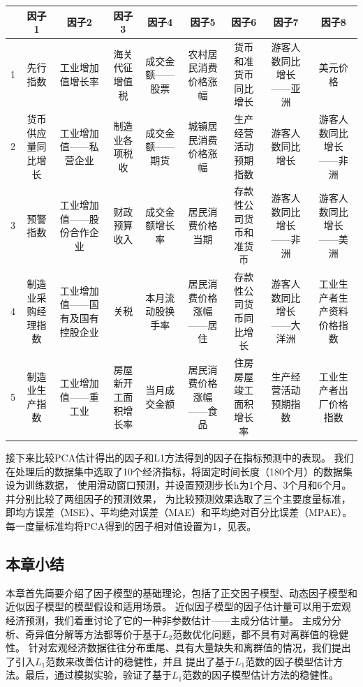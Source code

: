 \begin{table}[]

    \begin{tabular}{@{}ccccccccc@{}}
    \toprule
      & 因子1       & 因子2              & 因子3        & 因子4      & 因子5          & 因子6         & 因子7           & 因子8           \\ \midrule
    1 & 先行指数      & 工业增加值增长率         & 海关代征增值税    & 成交金额——股票 & 农村居民消费价格涨幅   & 货币和准货币同比增长  & 游客人数同比增长——亚洲  & 美元价格          \\
    2 & 货币供应量同比增长 & 工业增加值——私营企业      & 制造业各项税收    & 成交金额——期货 & 城镇居民消费价格涨幅   & 生产经营活动预期指数  & 游客人数同比增长      & 游客人数同比增长——非洲  \\
    3 & 预警指数      & 工业增加值——股份合作企业    & 财政预算收入     & 成交金额增长率  & 居民消费价格当期     & 存款性公司货币和准货币 & 游客人数同比增长——非洲  & 游客人数同比增长——美洲  \\
    4 & 制造业采购经理指数 & 工业增加值——国有及国有控股企业 & 关税         & 本月流动股换手率 & 居民消费价格涨幅——居住 & 存款性公司货币同比增长 & 游客人数同比增长——大洋洲 & 工业生产者生产资料价格指数 \\
    5 & 制造业生产指数   & 工业增加值——重工业       & 房屋新开工面积增长率 & 当月成交金额   & 居民消费价格涨幅——食品 & 住房房屋竣工面积增长率 & 生产经营活动预期指数    & 工业生产者出厂价格指数   \\ \bottomrule
    \end{tabular}
\end{table}

接下来比较PCA估计得出的因子和L1方法得到的因子在指标预测中的表现。
我们在处理后的数据集中选取了10个经济指标，将固定时间长度（180个月）的数据集设为训练数据，
使用滑动窗口预测，并设置预测步长h为1个月、3个月和6个月。并分别比较了两组因子的预测效果，
为比较预测效果选取了三个主要度量标准，即均方误差（MSE）、平均绝对误差（MAE）和平均绝对百分比误差（MPAE）。
每一度量标准均将PCA得到的因子相对值设置为1，见表。


\subsection{本章小结}
本章首先简要介绍了因子模型的基础理论，包括了正交因子模型、动态因子模型和近似因子模型的模型假设和适用场景。
近似因子模型的因子估计量可以用于宏观经济预测，我们着重讨论了它的一种非参数估计——主成分估计量。
主成分分析、奇异值分解等方法都等价于基于$L_2$范数优化问题，都不具有对离群值的稳健性。
针对宏观经济数据往往分布重尾、具有大量缺失和离群值的情况，我们提出了引入$L_1$范数来改善估计的稳健性，并且
提出了基于$L_1$范数的因子模型估计方法。最后，通过模拟实验，验证了基于$L_1$范数的因子模型估计方法的稳健性。